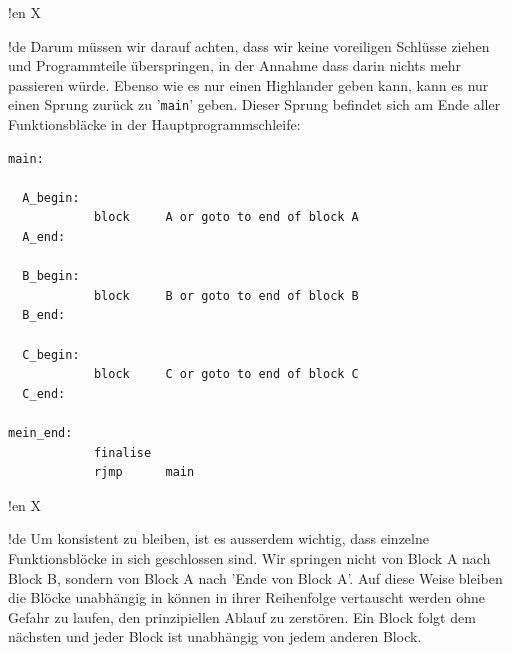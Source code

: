 !en X

!de Darum müssen wir darauf achten, dass wir keine voreiligen Schlüsse ziehen und Programmteile überspringen, in der Annahme dass darin nichts mehr passieren würde. Ebenso wie es nur einen Highlander geben kann, kann es nur einen Sprung zurück zu '\texttt{main}' geben. Dieser Sprung befindet sich am Ende aller Funktionsbläcke in der Hauptprogrammschleife:

\begin{lstlisting}
main:

  A_begin:
            block     A or goto to end of block A
  A_end:

  B_begin:
            block     B or goto to end of block B
  B_end:

  C_begin:
            block     C or goto to end of block C
  C_end:

mein_end:
            finalise
            rjmp      main
\end{lstlisting}



!en X

!de Um konsistent zu bleiben, ist es ausserdem wichtig, dass einzelne Funktionsblöcke in sich geschlossen sind. Wir springen nicht von Block A nach Block B, sondern von Block A nach 'Ende von Block A'. Auf diese Weise bleiben die Blöcke unabhängig in können in ihrer Reihenfolge vertauscht werden ohne Gefahr zu laufen, den prinzipiellen Ablauf zu zerstören. Ein Block folgt dem nächsten und jeder Block ist unabhängig von jedem anderen Block.
